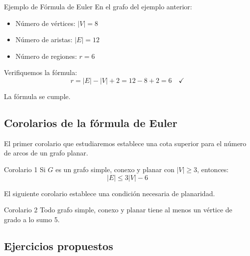 \begin{exampleblock}{Ejemplo de Fórmula de Euler}
En el grafo del ejemplo anterior:
\begin{itemize}
  \item Número de vértices: \( |V| = 8 \)
  \item Número de aristas: \( |E| = 12 \)
  \item Número de regiones: \( r = 6 \)
\end{itemize}

Verifiquemos la fórmula:
\[ r = |E| - |V| + 2 = 12 - 8 + 2 = 6 \quad \checkmark \]

La fórmula se cumple.
\end{exampleblock}

\subsection{Corolarios de la fórmula de Euler}
El primer corolario que estudiaremos establece una cota superior para el número de arcos de un grafo planar.
\begin{thmblock}{Corolario 1}
Si \( G \) es un grafo simple, conexo y planar con \( |V| \geq 3 \), entonces:
\[
|E| \leq 3|V| - 6
\]
\end{thmblock}

El siguiente corolario establece una condición necesaria de planaridad.
\begin{thmblock}{Corolario 2}
Todo grafo simple, conexo y planar tiene al menos un vértice de grado a lo sumo 5.
\end{thmblock}

\subsection*{Ejercicios propuestos}

